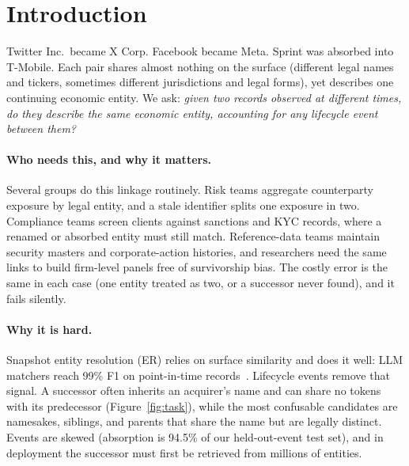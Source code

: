 \documentclass[sigconf]{acmart}
\begin{document}


\maketitle

\section{Introduction}
\label{sec:intro}

Twitter Inc.\ became X Corp. Facebook became Meta. Sprint was
absorbed into T-Mobile. Each pair shares almost nothing on the
surface (different legal names and tickers, sometimes different
jurisdictions and legal forms), yet describes one continuing
economic entity. We ask: \emph{given two records observed at
different times, do they describe the same economic entity,
accounting for any lifecycle event between them?}

\paragraph{Who needs this, and why it matters.} Several groups do
this linkage routinely. Risk teams aggregate counterparty exposure
by legal entity, and a stale identifier splits one exposure in two.
Compliance teams screen clients against sanctions and KYC records,
where a renamed or absorbed entity must still match.
Reference-data teams maintain security masters and corporate-action
histories, and researchers need the same links to build firm-level
panels free of survivorship bias. The costly error is the same in
each case (one entity treated as two, or a successor never found),
and it fails silently.

\paragraph{Why it is hard.} Snapshot entity resolution (ER) relies
on surface similarity and does it well: LLM matchers reach 99\% F1
on point-in-time records~\cite{opensanctions2026}. Lifecycle events
remove that signal. A successor often inherits an acquirer's name
and can share no tokens with its predecessor
(Figure~\ref{fig:task}), while the most confusable candidates are
namesakes, siblings, and parents that share the name but are
legally distinct. Events are skewed (absorption is 94.5\% of our
held-out-event test set), and in deployment the successor must
first be retrieved from millions of entities.
\end{document}

